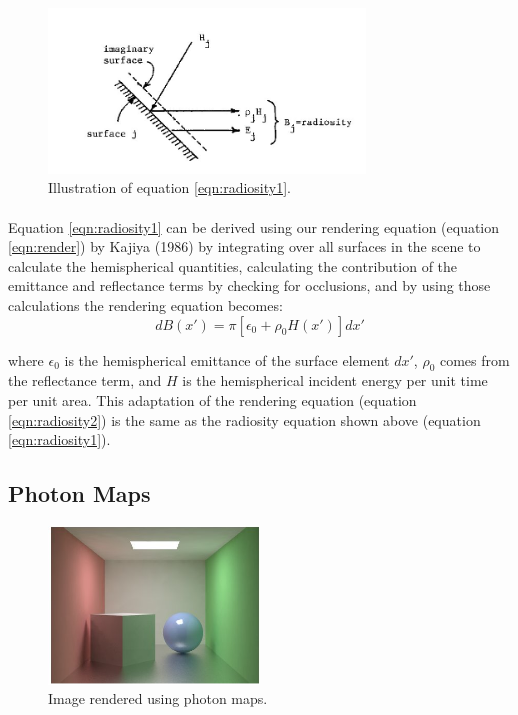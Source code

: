 \begin{figure}[h!]
  \centering
    \includegraphics[width=0.75\textwidth]{radiosityCalc2.jpg}
  \caption{Illustration of equation \ref{eqn:radiosity1}.}
	\label{fig:radiosityCalc2}
\end{figure}

\paragraph{}
Equation \ref{eqn:radiosity1} can be derived using our rendering equation (equation \ref{eqn:render}) by Kajiya (1986) by integrating over all surfaces in the scene to calculate the hemispherical quantities, calculating the contribution of the emittance and reflectance terms by checking for occlusions, and by using those calculations the rendering equation becomes:
\begin{equation}
dB(x') = \pi[\epsilon_{0} + \rho_{0}H(x')]dx' \label{eqn:radiosity2}
\end{equation}

where $\epsilon_{0}$ is the hemispherical emittance of the surface element $dx'$, $\rho_{0}$ comes from the reflectance term, and $H$ is the hemispherical incident energy per unit time per unit area.  This adaptation of the rendering equation (equation \ref{eqn:radiosity2}) is the same as the radiosity equation shown above (equation \ref{eqn:radiosity1}).

\subsection{Photon Maps}

\begin{figure}[h!]
  \centering
    \includegraphics[width=0.5\textwidth]{photonSample.jpg}
  \caption{Image rendered using photon maps.}
	\label{fig:photonSample}
\end{figure}

